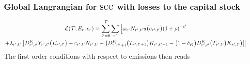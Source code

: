 \documentclass[preprint,3p,authoryear]{elsarticle}
\begin{document}
\subsubsection{Global Langrangian for $\operatorname{SCC}$ with losses to the capital stock}
\label{sec:LKglob}
\begin{multline}
  \label{eq:LKglob} \mathcal{L}(\mathcal{T};E_r,c_r)\equiv\sum_{t'=0}^{\mathcal{T}}\sum_{r'}\left[\omega_{r'}N_{r',t'}u\big(c_{r',t'}\big)(1+\rho)^{-t'}\right.\\
  \left.+\lambda_{r',t'}\left[D^K_{r',t'}Y_{r',t'}\big(E_{r',t'}\big) -c_{r',t'}N_{r',t'}-\left(D^K_{r',t'+1}\big(T_{r',t'+1}\big)K_{r',t'+1}-\big(1-\delta_K\big)D^K_{r',t'}\big(T_{r',t'}\big)K_{r',t'}\right) \right]\right]
\end{multline}
The first order conditions with respect to emissions then reads
\end{document}
